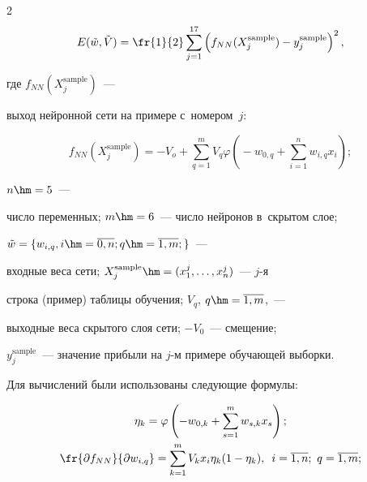 \begin{multicols}{2}
$$


E(\tilde{w},\tilde{V})= \fr{1}{2} 


\sum\limits_{j=1}^{17} \left( f_{NN}(X_j^{\mathrm{sample}})-


y_j^{\mathrm{sample}} \right)^2,$$


где $f_{NN}(X_j^{\mathrm{sample}})$~---


выход нейронной сети на примере с~номером~$j$:


$$


f_{NN}(X_j^{\mathrm{sample}})=-V_o+\sum\limits_{q=1}^m \! V_q  \varphi 


\left(\! -w_{0,q}+ \sum\limits_{i=1}^n \! w_{i,q}x_i\! \right);


$$  


$n\hm=5$~--- 


число переменных;  $m\hm=6$~--- число нейронов в~скрытом слое;


$ \tilde{w}=\{w_{i,q}, i\hm=\overline{0,n}; q\hm=\overline{1,m};\}$~--- 


входные веса сети; $X_j^{\mathrm{sample}}\hm= (x_1^j,\dots,x_n^j)$~--- $j$-я 


строка (пример) таблицы обучения; $V_q$,  $q\hm=\overline{1,m}$,~--- 


выходные веса скрытого слоя сети;  $-V_0$~--- смещение; 


$y_j^{\mathrm{sample}}$~--- значение прибыли на $j$-м примере обучающей выборки.


Для вычислений были использованы следующие формулы: 





\noindent


\begin{gather*}


\eta_k=\varphi \left(-w_{0,k} +\sum\limits_{s=1}^m w_{s,k}x_s \right); \\


\fr{\partial f_{NN}} {\partial w_{i,q}}= 


\sum\limits_{k=1}^m V_k x_i \eta_k (1 - \eta_k), \enskip i=\overline{1,n}; \


\mathrm{}q=\overline{1,m};


\end{gather*}





\noindent


\begin{gather*}



\end{gather*}
\end{multicols}
